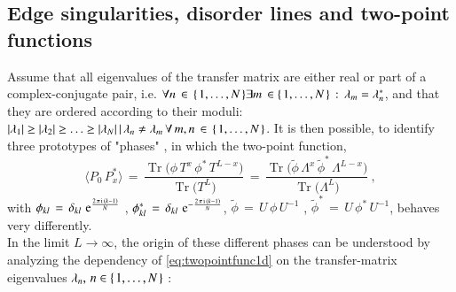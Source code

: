 \documentclass[epj]{webofc}
\let\originalleft\left
\let\originalright\right
\renewcommand{\left}{\mathopen{}\mathclose\bgroup\originalleft}
\renewcommand{\right}{\aftergroup\egroup\originalright}
\newcommand{\e}{\operatorname{e}}
\newcommand{\of}[1]{\left(#1\right)}
\newcommand{\cof}[1]{\left\{\right.#1\left.\right\}}
\newcommand{\sTrace}[1]{\operatorname{Tr}\big(#1\big)}
\newcommand{\savof}[1]{\big\langle #1\big\rangle}
\newcommand{\ii}{\mathrm{i}}
\newcommand{\abs}[1]{\left| #1\right|}
\renewcommand*\[{\begin{equation}}
\renewcommand*\]{\end{equation}}
\begin{document}
\subsection{Edge singularities, disorder lines and two-point functions}\label{ssec:edgesinganddolines}
Assume that all eigenvalues of the transfer matrix are either real or part of a complex-conjugate pair, i.e. $\forall n\,\in\,\cof{1,\ldots,N} \exists m\,\in\cof{1,\ldots,N}\,:\,\lambda_{m}=\lambda^{*}_{n}$, and that they are ordered according to their moduli: $\abs{\lambda_{1}}\geq\abs{\lambda_{2}}\geq\ldots\geq\abs{\lambda_{N}}\,|\,\lambda_{n}\neq\lambda_{m}\,\forall\,m,n\,\in\,\cof{1,\ldots,N}$. It is then possible, to identify three prototypes of "phases" \cite{Meisinger:2010be,Akerlund:2016myr}, in which the two-point function,
\[
\savof{P_{0}\,P^{*}_{x}}\,=\,\frac{\sTrace{\phi\,T^{x}\,\phi^{*}\,T^{L-x}}}{\sTrace{T^{L}}}\,=\,\frac{\sTrace{\tilde{\phi}\,\Lambda^{x}\,\tilde{\phi}^{*}\,\Lambda^{L-x}}}{\sTrace{\Lambda^{L}}}\ ,\label{eq:twopointfunc1d}
\]
with $\phi_{k l}\,=\,\delta_{k l}\,\e^{\frac{2\,\pi\,\ii\,\of{k-1}}{N}}$ , $\phi^{*}_{k l}\,=\,\delta_{k l}\,\e^{-\frac{2\,\pi\,\ii\,\of{k-1}}{N}}$, $\tilde{\phi}\,=\,U\,\phi\,U^{-1}$ , $\tilde{\phi}^{*}\,=\,U\,\phi^{*}\,U^{-1}$, behaves very differently.\\
In the limit $L\to\infty$, the origin of these different phases can be understood by analyzing the  dependency of \eqref{eq:twopointfunc1d} on the transfer-matrix eigenvalues $\lambda_{n},\,n\in\cof{1,\ldots,N}$ \cite{Akerlund:2016myr}:
\end{document}
